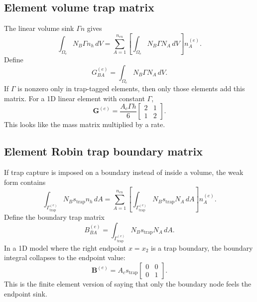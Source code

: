 \documentclass[11pt]{article}
\newcommand{\trap}{\mathrm{trap}}
\begin{document}
\subsection{Element volume trap matrix}
The linear volume sink $\Gamma n$ gives
\begin{equation}
\int_{\Omega_e}N_B\Gamma n_h\,dV
=\sum_{A=1}^{n_{en}}\left[\int_{\Omega_e}N_B\Gamma N_A\,dV\right]n_A^{(e)}.
\end{equation}
Define
\begin{equation}
G_{BA}^{(e)}=\int_{\Omega_e}N_B\Gamma N_A\,dV.
\label{eq:fem_qp_volume_trap_matrix}
\end{equation}
If $\Gamma$ is nonzero only in trap-tagged elements, then only those elements add this matrix. For a 1D linear element with constant $\Gamma$,
\begin{equation}
\bm{G}^{(e)}=\frac{A_c\Gamma h}{6}
\begin{bmatrix}
2&1\\
1&2
\end{bmatrix}.
\end{equation}
This looks like the mass matrix multiplied by a rate.

\subsection{Element Robin trap boundary matrix}
If trap capture is imposed on a boundary instead of inside a volume, the weak form contains
\begin{equation}
\int_{\Gamma_{\trap}^{(e)}}N_Bs_{\trap}n_h\,dA
=\sum_{A=1}^{n_{en}}\left[\int_{\Gamma_{\trap}^{(e)}}N_Bs_{\trap}N_A\,dA\right]n_A^{(e)}.
\end{equation}
Define the boundary trap matrix
\begin{equation}
B_{BA}^{(e)}=\int_{\Gamma_{\trap}^{(e)}}N_Bs_{\trap}N_A\,dA.
\label{eq:fem_qp_boundary_trap_matrix}
\end{equation}
In a 1D model where the right endpoint $x=x_2$ is a trap boundary, the boundary integral collapses to the endpoint value:
\begin{equation}
\bm{B}^{(e)}=A_c s_{\trap}
\begin{bmatrix}
0&0\\
0&1
\end{bmatrix}.
\end{equation}
This is the finite element version of saying that only the boundary node feels the endpoint sink.
\end{document}
